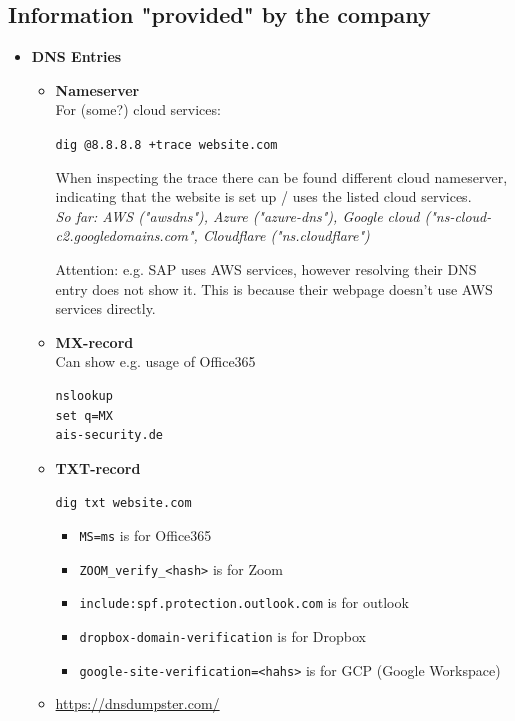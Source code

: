 \documentclass[12pt]{article}
\begin{document}
\subsection*{Information "provided" by the company}
\begin{itemize}
    \item \textbf{DNS Entries}
    \begin{itemize}
        \item \textbf{Nameserver}\\
        For (some?) cloud services:
    
        \verb|dig @8.8.8.8 +trace website.com|
        
        When inspecting the trace there can be found different cloud nameserver, indicating that the website is set up / uses the listed cloud services. \\
        \textit{So far: AWS ("awsdns"), Azure ("azure-dns"), Google cloud ("ns-cloud-c2.googledomains.com", Cloudflare ("ns.cloudflare")}
        
        Attention: e.g. SAP uses AWS services, however resolving their DNS entry does not show it. This is because their webpage doesn't use AWS services directly.
        
        \item \textbf{MX-record} \\
        Can show e.g. usage of Office365
        \begin{verbatim}
nslookup
set q=MX
ais-security.de
        \end{verbatim}
        
        \item \textbf{TXT-record}
        
        \verb|dig txt website.com|
        \begin{itemize}
            \item \verb|MS=ms| is for Office365
            \item \verb|ZOOM_verify_<hash>| is for Zoom
            \item \verb|include:spf.protection.outlook.com| is for outlook
            \item \verb|dropbox-domain-verification| is for Dropbox
            \item \verb|google-site-verification=<hahs>| is for GCP (Google Workspace)
        \end{itemize}
        
        
        \item \url{https://dnsdumpster.com/}
        

\end{itemize}
\end{itemize}
\end{document}
